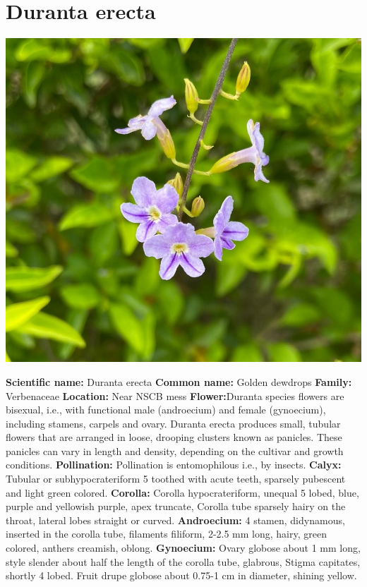\documentclass{article}
\begin{document}
\section{Duranta erecta}
\begin{center}
    \includegraphics[scale=0.22]{images/blpr.jpg}
\end{center}
\textbf{Scientific name:} Duranta erecta\newline
\textbf{Common name:} Golden dewdrops\newline
\textbf{Family:}  Verbenaceae\newline
\textbf{Location:} Near NSCB mess\newline
\textbf{Flower:}Duranta species flowers are bisexual, i.e., with functional male (androecium) and female (gynoecium), including stamens, carpels and ovary. Duranta erecta produces small, tubular flowers that are arranged in loose, drooping clusters known as panicles. These panicles can vary in length and density, depending on the cultivar and growth conditions. \newline
\textbf{Pollination:} Pollination is entomophilous i.e., by insects.  
\newline
\textbf{}\newline
\textbf{Calyx:} Tubular or subhypocrateriform 5 toothed with acute teeth, sparsely pubescent and light green colored.\newline
\textbf{Corolla:} Corolla hypocrateriform, unequal 5 lobed, blue, purple and yellowish purple, apex truncate, Corolla tube sparsely hairy on the throat, lateral lobes straight or curved.\newline
\textbf{Androecium:} 4 stamen, didynamous, inserted in the corolla tube, filaments filiform, 2-2.5 mm long, hairy, green colored, anthers creamish, oblong.\newline
\textbf{Gynoecium:} Ovary globose about 1 mm long, style slender about half the length of the corolla tube, glabrous, Stigma capitates, shortly 4 lobed. Fruit drupe globose about 0.75-1 cm in diameter, shining yellow.
\end{document}
